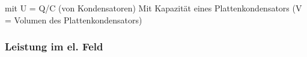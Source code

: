          mit U = Q/C (von Kondensatoren)
        Mit Kapazität eines Plattenkondensators (V = Volumen des Plattenkondensators)

    \subsubsection{Leistung im el. Feld}
    